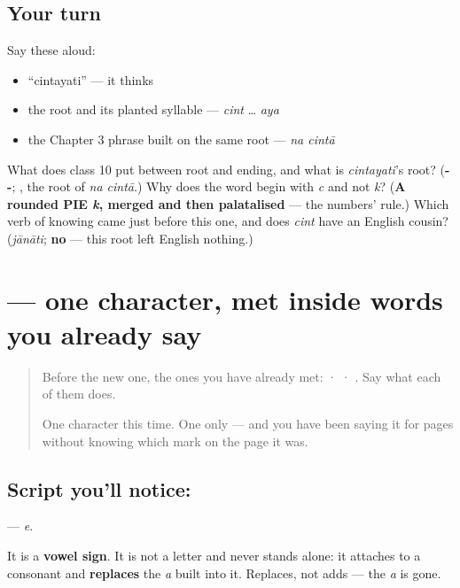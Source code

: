 \subsection*{Your turn}
Say these aloud:

\begin{itemize}
\raggedright
  \item \textquotedblleft{}cintayati\textquotedblright{} — it thinks
  \item the root and its planted syllable — \emph{cint} … \emph{aya}
  \item the Chapter 3 phrase built on the same root — \emph{na cintā}
\end{itemize}

\begin{tcolorbox}[breakable,colback=teal!4,colframe=teal!35!black,title={Before you move on}]
What does class 10 put between root and ending, and what is \emph{cintayati}'s root? (\textbf{--}; \textbf{}, the root of \emph{na cintā}.) Why does the word begin with \emph{c} and not \emph{k}? (\textbf{A rounded PIE \emph{k}, merged and then palatalised} — the numbers' rule.) Which verb of knowing came just before this one, and does \emph{cint} have an English cousin? (\emph{jānāti}; \textbf{no} — this root left English nothing.)
\end{tcolorbox}
\section[\texorpdfstring{\sk{े} (e)}{े (e)}]{ — one character, met inside words you already say}

\label{lesson:SA-S112-vowel-sign-e}



\begin{quote}
Before the new one, the ones you have already met:  ·  · . Say what each of them does.

One character this time. One only — and you have been saying it for pages without knowing which mark on the page it was.
\end{quote}

\subsection*{Script you'll notice: }
\textbf{} — \emph{e}.

It is a \textbf{vowel sign}. It is not a letter and never stands alone: it attaches to a consonant and \textbf{replaces} the \emph{a} built into it. Replaces, not adds — the \emph{a} is gone.

